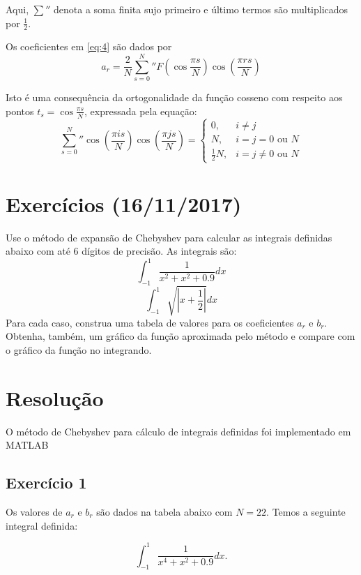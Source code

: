 \documentclass[10pt,a4paper]{article}
\begin{document}
	Aqui, ${\sum}''$ denota a soma finita sujo primeiro e último termos são multiplicados por $\frac{1}{2}$.
	
	Os coeficientes em \ref{eq:4} são dados por
	\[a_r = \frac{2}{N}{\sum_{s=0}^N}'' F\left(\cos{\frac{\pi s}{N}}\right)\cos{\left(\frac{\pi r s}{N}\right)}\]
	
	Isto é uma consequência da ortogonalidade da função cosseno com respeito aos pontos $t_s=\cos{\frac{\pi s}{N}}$, expressada pela equação:
	\[{\sum_{s=0}^N}'' \cos{\left(\frac{\pi i s}{N}\right)}\cos{\left(\frac{\pi j s}{N}\right)} = \begin{cases}0,&i\neq j\\N,&i=j=0\mbox{ ou }N\\\frac{1}{2}N,&i=j\neq 0\mbox{ ou }N\end{cases}\]
	
	\section{Exercícios (16/11/2017)}
	Use o método de expansão de Chebyshev para calcular as integrais definidas abaixo com até 6 dígitos de precisão. As integrais são:
	\[\int_{-1}^1 \frac{1}{x^2+x^2+0.9}dx\]
	\[\int_{-1}^1 \sqrt{\left|x+\frac{1}{2}\right|}dx\]
	\noindent Para cada caso, construa uma tabela de valores para os coeficientes $a_r$ e $b_r$. Obtenha, também, um gráfico da função aproximada pelo método e compare com o gráfico da função no integrando.
	
	\section{Resolução}
	
	O método de Chebyshev para cálculo de integrais definidas foi implementado em MATLAB
	
	\subsection{Exercício 1}
	Os valores de $a_r$ e $b_r$ são dados na tabela abaixo com $N=22$. Temos a seguinte integral definida:
    
    \[\int_{-1}^1 \frac{1}{x^4+x^2+0.9} dx.\]
\end{document}
